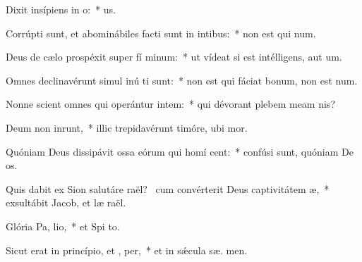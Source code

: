 \item Dixit insípiens in  o:~*   us.
\item Corrúpti sunt, et abominábiles facti sunt in intibus:~* non est qui  num.
\item Deus de cælo prospéxit super fí minum:~* ut vídeat si est intélligens, aut  um.
\item Omnes declinavérunt simul inú ti sunt:~* non est qui fáciat bonum, non est   num.
\item Nonne scient omnes qui operántur intem:~* qui dévorant plebem meam   nis?
\item Deum non inrunt,~* illic trepidavérunt timóre, ubi   mor.
\item Quóniam Deus dissipávit ossa eórum qui homí cent:~* confúsi sunt, quóniam De  os.
\item Quis dabit ex Sion salutáre raël?~\pscross{} cum convérterit Deus captivitátem  æ,~* exsultábit Jacob, et læ raël.
\item Glória Pa,  lio,~* et Spi to.
\item Sicut erat in princípio, et ,  per,~* et in sǽcula sæ. men.
